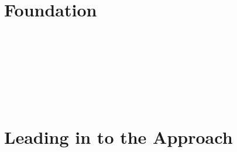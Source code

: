 \documentclass[12pt,oneside]{book}
\begin{document}
\newtheorem*{mydef}{Definition}






\newpage \ \newpage \ 
\part{Foundation}

%

\newpage\ 


\newpage\ 


\newpage\ 


\newpage\ 
\part{Leading in to the Approach}
\newpage\ 

\end{document}
